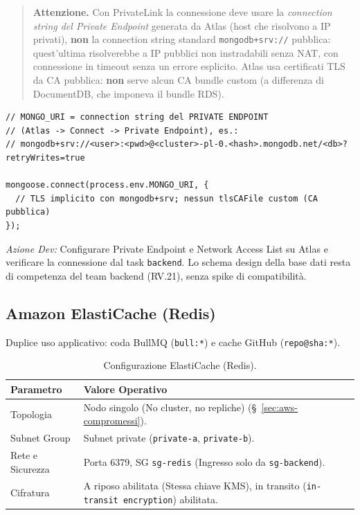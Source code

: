 \documentclass[11pt,a4paper]{article}
\begin{document}
\begin{quote}
\textbf{Attenzione.} Con PrivateLink la connessione deve usare la \emph{connection string del Private Endpoint} generata da Atlas (host che risolvono a IP privati), \textbf{non} la connection string standard \texttt{mongodb+srv://} pubblica: quest'ultima risolverebbe a IP pubblici non instradabili senza NAT, con connessione in timeout senza un errore esplicito. Atlas usa certificati TLS da CA pubblica: \textbf{non} serve alcun CA bundle custom (a differenza di DocumentDB, che imponeva il bundle RDS).
\end{quote}

\begin{lstlisting}[caption={Connessione Mongoose a MongoDB Atlas (Private Endpoint)}]
// MONGO_URI = connection string del PRIVATE ENDPOINT
// (Atlas -> Connect -> Private Endpoint), es.:
// mongodb+srv://<user>:<pwd>@<cluster>-pl-0.<hash>.mongodb.net/<db>?retryWrites=true

mongoose.connect(process.env.MONGO_URI, {
  // TLS implicito con mongodb+srv; nessun tlsCAFile custom (CA pubblica)
});
\end{lstlisting}

\emph{Azione Dev:} Configurare Private Endpoint e Network Access List su Atlas e verificare la connessione dal task \texttt{backend}. Lo schema design della base dati resta di competenza del team backend (RV.21), senza spike di compatibilità.

\subsection{Amazon ElastiCache (Redis)}

Duplice uso applicativo: coda BullMQ (\texttt{bull:*}) e cache GitHub (\texttt{repo@sha:*}).

\begin{table}[H]
\centering
\caption{Configurazione ElastiCache (Redis).}
\label{tab:aws-redis}
\vspace{2mm}
\renewcommand{\arraystretch}{1.2}
\begin{tabularx}{\textwidth}{|l|X|}
\hline
\textbf{Parametro} & \textbf{Valore Operativo} \\ \hline
Topologia & Nodo singolo (No cluster, no repliche) (\S~\ref{sec:aws-compromessi}). \\ \hline
Subnet Group & Subnet private (\texttt{private-a}, \texttt{private-b}). \\ \hline
Rete e Sicurezza & Porta 6379, SG \texttt{sg-redis} (Ingresso solo da \texttt{sg-backend}). \\ \hline
Cifratura & A riposo abilitata (Stessa chiave KMS), in transito (\texttt{in-transit encryption}) abilitata. \\ \hline
\end{tabularx}
\end{table}
\end{document}
